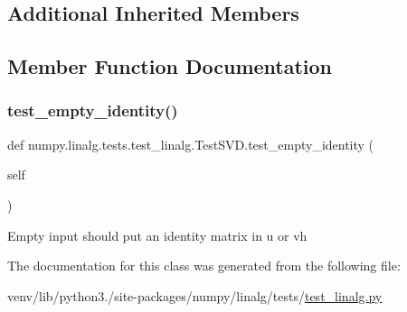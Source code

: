 \subsection*{Additional Inherited Members}


\subsection{Member Function Documentation}
\mbox{\label{classnumpy_1_1linalg_1_1tests_1_1test__linalg_1_1TestSVD_a79d09cdfc6fee201188b519851f73568}} 
\subsubsection{\texorpdfstring{test\+\_\+empty\+\_\+identity()}{test\_empty\_identity()}}
{\footnotesize\ttfamily def numpy.\+linalg.\+tests.\+test\+\_\+linalg.\+Test\+S\+V\+D.\+test\+\_\+empty\+\_\+identity (\begin{DoxyParamCaption}\item[{}]{self }\end{DoxyParamCaption})}

\begin{DoxyVerb}Empty input should put an identity matrix in u or vh \end{DoxyVerb}
 

The documentation for this class was generated from the following file\+:\begin{DoxyCompactItemize}
\item 
venv/lib/python3./site-\/packages/numpy/linalg/tests/\hyperlink{test__linalg_8py}{test\+\_\+linalg.\+py}\end{DoxyCompactItemize}
